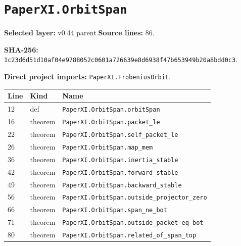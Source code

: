 \documentclass[10pt,oneside]{book}
\begin{document}
\section{\texorpdfstring{\nolinkurl{PaperXI.OrbitSpan}}{PaperXI.OrbitSpan}}\label{module:PaperXI.OrbitSpan}

\textbf{Selected layer:} v0.44 parent.\quad\textbf{Source lines:} 86.\par\textbf{SHA-256:} {\scriptsize\nolinkurl{1c23d6d51d10af04e9788052c0601a726639e8d6938f47b653949b20a8bdd0c3}}.


\textbf{Direct project imports:} \nolinkurl{PaperXI.FrobeniusOrbit}.

\begin{longtable}{@{}p{}p{}p{}@{}}\toprule Line&Kind&Name\\\midrule\endhead

12&def&\nolinkurl{PaperXI.OrbitSpan.orbitSpan}\\

16&theorem&\nolinkurl{PaperXI.OrbitSpan.packet_le}\\

22&theorem&\nolinkurl{PaperXI.OrbitSpan.self_packet_le}\\

26&theorem&\nolinkurl{PaperXI.OrbitSpan.map_mem}\\

36&theorem&\nolinkurl{PaperXI.OrbitSpan.inertia_stable}\\

42&theorem&\nolinkurl{PaperXI.OrbitSpan.forward_stable}\\

49&theorem&\nolinkurl{PaperXI.OrbitSpan.backward_stable}\\

56&theorem&\nolinkurl{PaperXI.OrbitSpan.outside_projector_zero}\\

66&theorem&\nolinkurl{PaperXI.OrbitSpan.span_ne_bot}\\

71&theorem&\nolinkurl{PaperXI.OrbitSpan.outside_packet_eq_bot}\\

80&theorem&\nolinkurl{PaperXI.OrbitSpan.related_of_span_top}\\

\bottomrule\end{longtable}
\end{document}
